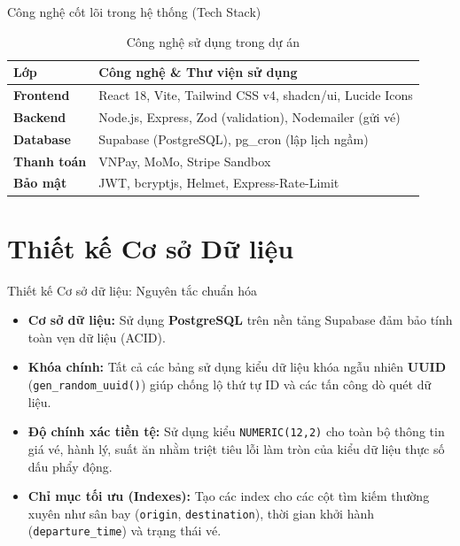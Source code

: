 \documentclass{beamer}
\begin{document}
\begin{frame}{Công nghệ cốt lõi trong hệ thống (Tech Stack)}
  \begin{table}
    \centering
    \small
    \begin{tabular}{lp{7.5cm}}
      \toprule
      \textbf{Lớp} & \textbf{Công nghệ \& Thư viện sử dụng} \\
      \midrule
      \textbf{Frontend} & React 18, Vite, Tailwind CSS v4, shadcn/ui, Lucide Icons \\
      \textbf{Backend} & Node.js, Express, Zod (validation), Nodemailer (gửi vé) \\
      \textbf{Database} & Supabase (PostgreSQL), pg\_cron (lập lịch ngầm) \\
      \textbf{Thanh toán} & VNPay, MoMo, Stripe Sandbox \\
      \textbf{Bảo mật} & JWT, bcryptjs, Helmet, Express-Rate-Limit \\
      \bottomrule
    \end{tabular}
    \caption{Công nghệ sử dụng trong dự án}
  \end{table}
\end{frame}

\section{Thiết kế Cơ sở Dữ liệu}

\begin{frame}{Thiết kế Cơ sở dữ liệu: Nguyên tắc chuẩn hóa}
  \begin{itemize}
    \item \textbf{Cơ sở dữ liệu:} Sử dụng \textbf{PostgreSQL} trên nền tảng Supabase đảm bảo tính toàn vẹn dữ liệu (ACID).
    \item \textbf{Khóa chính:} Tất cả các bảng sử dụng kiểu dữ liệu khóa ngẫu nhiên \textbf{UUID} (\texttt{gen\_random\_uuid()}) giúp chống lộ thứ tự ID và các tấn công dò quét dữ liệu.
    \item \textbf{Độ chính xác tiền tệ:} Sử dụng kiểu \texttt{NUMERIC(12,2)} cho toàn bộ thông tin giá vé, hành lý, suất ăn nhằm triệt tiêu lỗi làm tròn của kiểu dữ liệu thực số dấu phẩy động.
    \item \textbf{Chỉ mục tối ưu (Indexes):} Tạo các index cho các cột tìm kiếm thường xuyên như sân bay (\texttt{origin}, \texttt{destination}), thời gian khởi hành (\texttt{departure\_time}) và trạng thái vé.
  \end{itemize}
\end{frame}
\end{document}
